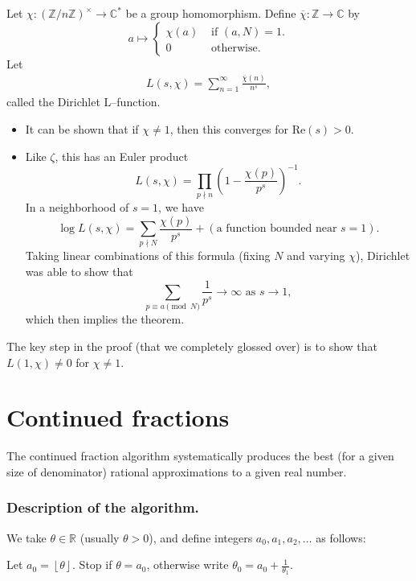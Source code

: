 \documentclass{article}
\theoremstyle{definition}
\begin{document}
Let $\chi : (\mathbb{Z}/n\mathbb{Z})^\times \to \mathbb{C}^{*}$ be a group homomorphism. Define $\overline{\chi} : \mathbb{Z} \to \mathbb{C}$ by $$a \mapsto \begin{cases}
    \chi(a) &\text{ if } (a,N)=1.\\
    0 &\text{ otherwise.}
\end{cases}$$
Let 
\begin{align*}
    L(s,\chi) = \sum_{n=1}^{\infty} \frac{\overline{\chi}(n)}{n^s},
\end{align*}
called the Dirichlet L--function.
\begin{itemize}
    \item  It can be shown that if $\chi \neq1$, then this converges for $\text{Re}(s)>0$.
    \item Like $\zeta$, this has an Euler product 
    \[
    L(s,\chi) =\prod_{p \nmid n }^{} \left(1-\frac{\chi(p)}{p^s}\right)^{-1}.
    \]
    In a neighborhood of $s=1$, we have $$\log L(s,\chi) = \sum_{p \nmid N}^{} \frac{\chi(p)}{p^s} + (\text{a function bounded near }s=1).$$
    Taking linear combinations of this formula (fixing $N$ and varying $\chi$), Dirichlet was able to show that 
    \[
    \sum_{p\equiv a\pmod{N}}^{} \frac{1}{p^s} \to \infty \text{ as } s \to 1,
    \]
    which then implies the theorem.
\end{itemize} 
The key step in the proof (that we completely glossed over) is to show that $L(1,\chi) \neq 0$ for $\chi \neq 1$.

\section{Continued fractions}


The continued fraction algorithm systematically produces the best (for a given size of denominator) rational approximations to a given real number.

\subsubsection*{Description of the algorithm.}

We take $\theta \in \mathbb{R}$ (usually $\theta>0$), and define integers $a_0,a_1,a_2,\ldots$ as follows:
\vspace{1mm}

Let $a_0 = \left\lfloor \theta \right\rfloor$. Stop if $\theta = a_0$, otherwise write $\theta_0 = a_0 + \frac{1}{\theta_1}$.
\vspace{1mm}
\end{document}
